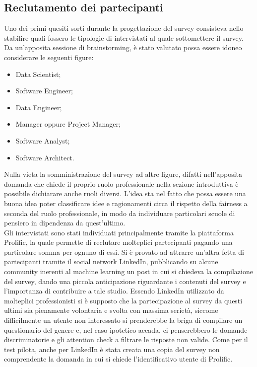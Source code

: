 \subsection{Reclutamento dei partecipanti}
Uno dei primi quesiti sorti durante la progettazione del survey consisteva nello stabilire quali fossero le tipologie di intervistati al quale sottomettere il survey. Da un'apposita sessione di brainstorming, è stato valutato possa essere idoneo considerare le seguenti figure:
\begin{itemize}
    \item Data Scientist;
    \item Software Engineer;
    \item Data Engineer;
    \item Manager oppure Project Manager;
    \item Software Analyst;
    \item Software Architect.
\end{itemize}
Nulla vieta la somministrazione del survey ad altre figure, difatti nell'apposita domanda che chiede il proprio ruolo professionale nella sezione introduttiva è possibile dichiarare anche ruoli diversi. L'idea sta nel fatto che possa essere una buona idea poter classificare idee e ragionamenti circa il rispetto della fairness a seconda del ruolo professionale, in modo da individuare particolari scuole di pensiero in dipendenza da quest'ultimo.\\
Gli intervistati sono stati individuati principalmente tramite la piattaforma Prolific, la quale permette di reclutare molteplici partecipanti pagando una particolare somma per ognuno di essi. Si è provato ad attrarre un'altra fetta di partecipanti tramite il social network LinkedIn, pubblicando su alcune community inerenti al machine learning un post in cui si chiedeva la compilazione del survey, dando una piccola anticipazione riguardante i contenuti del survey e l'importanza di contribuire a tale studio. Essendo LinkedIn utilizzato da molteplici professionisti si è supposto che la partecipazione al survey da questi ultimi sia pienamente volontaria e svolta con massima serietà, siccome difficilmente un utente non interessato si prenderebbe la briga di compilare un questionario del genere e, nel caso ipotetico accada, ci penserebbero le domande discriminatorie e gli attention check a filtrare le risposte non valide. Come per il test pilota, anche per LinkedIn è stata creata una copia del survey non comprendente la domanda in cui si chiede l'identificativo utente di Prolific.\\
